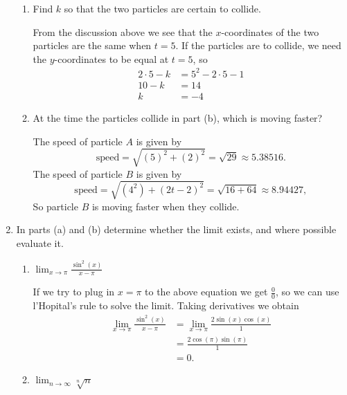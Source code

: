 \documentclass[11pt]{article}
\begin{document}
\begin{enumerate}
\begin{enumerate}
  \item Find $k$ so that the two particles are certain to collide.

    \vfill
    {\color{blue}
    From the discussion above we see that the $x$-coordinates of the
    two particles are the same when $t=5$.  If the particles are to
    collide, we need the $y$-coordinates to be equal at $t=5$, so
    \begin{align*}
      2\cdot 5 -k &= 5^2-2\cdot 5 -1\\
      10-k &= 14\\
      k &= -4
    \end{align*}
    }
    \vfill
    
  \item At the time the particles collide in part (b), which is moving
    faster?

    \vfill
    {\color{blue}
    The speed of particle $A$ is given by
    \[
    \text{speed} = \sqrt{(5)^2+(2)^2}=\sqrt{29}\approx 5.38516.
    \]
    The speed of particle $B$ is given by
    \[
    \text{speed} = \sqrt{(4^2)+(2t-2)^2} = \sqrt{16+64} \approx 8.94427,
    \]
    So particle $B$ is moving faster when they collide.
    }
    \vfill
  \end{enumerate}
  \newpage

\item In parts (a) and (b) determine whether the limit exists, and
  where possible evaluate it.
  \begin{enumerate}
  \item $\displaystyle\lim_{x\to \pi}\frac{\sin^2(x)}{x-\pi}$

    \vfill
    {\color{blue}
    If we try to plug in $x=\pi$ to the above equation we get
    $\frac{0}{0}$, so we can use l'Hopital's rule to solve the limit.
    Taking derivatives we obtain
    \begin{align*}
      \displaystyle\lim_{x\to \pi}\frac{\sin^2(x)}{x-\pi} &= \displaystyle\lim_{x\to \pi}\frac{2\sin(x)\cos(x)}{1}\\
      &= \frac{2\cos(\pi)\sin(\pi)}{1}\\
      &= 0.
    \end{align*}
    }
    \vfill
    
  \item $\displaystyle\lim_{n\to \infty}\sqrt[n]{n}$


\end{enumerate}
\end{enumerate}
\end{document}
